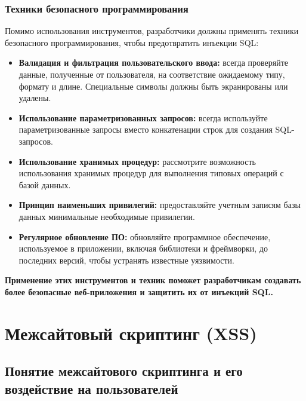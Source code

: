 \documentclass[a4paper,12pt]{diplom}
\begin{document}
	 \subsection{Техники безопасного программирования}
	 
	 Помимо использования инструментов,  разработчики должны применять техники безопасного программирования,  чтобы предотвратить инъекции SQL:
	 
	 \begin{itemize}
	 	\item \textbf{Валидация и фильтрация пользовательского ввода:}  всегда проверяйте данные,  полученные от пользователя,  на соответствие ожидаемому типу,  формату и длине.  Специальные символы должны быть экранированы или удалены. 
	 	\item \textbf{Использование параметризованных запросов:}  всегда используйте параметризованные запросы вместо конкатенации строк для создания SQL-запросов. 
	 	\item \textbf{Использование хранимых процедур:}  рассмотрите возможность использования хранимых процедур для выполнения типовых операций с базой данных. 
	 	\item \textbf{Принцип наименьших привилегий:}  предоставляйте учетным записям базы данных минимальные необходимые привилегии. 
	 	\item \textbf{Регулярное обновление ПО:}  обновляйте программное обеспечение,  используемое в приложении,  включая библиотеки и фреймворки,  до последних версий,  чтобы устранять известные уязвимости. 
	 \end{itemize}
	 	
	 \textbf{Применение этих инструментов и техник поможет разработчикам создавать более безопасные веб-приложения и защитить их от инъекций SQL.} 
	 	
	 
	 
	 
	 
	 
	 
	 
	 
	 
	 
	 
	 
	 
	 
	 
	 
	 
	 
	 \chapter[Межсайтовый скриптинг (XSS)]{Межсайтовый скриптинг (XSS)}
	 
	 \section{Понятие межсайтового скриптинга и его воздействие на пользователей}
	 
\end{document}
